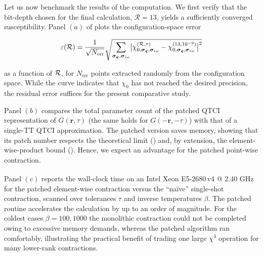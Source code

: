 Let us now benchmark the results of the computation. We first verify that the bit-depth chosen for the final calculation, \(\mathcal R=13\), yields a sufficiently converged susceptibility.
Panel $(a)$ of  plots the configuration-space error

\begin{equation}
    \varepsilon(\mathcal R)
  = \frac{1}{\sqrt{N_{\text{err}}}} \sqrt{\sum_{\boldsymbol{\sigma}_{\boldsymbol{q}},\boldsymbol{\sigma}_{i\omega}} \bigl|
      \chi_{0, \boldsymbol{\sigma}_{\boldsymbol{q}},\boldsymbol{\sigma}_{i\omega}}^{(\mathcal R,\tau)}
      -\chi_{0, \boldsymbol{\sigma}_{\boldsymbol{q}},\boldsymbol{\sigma}_{i\omega}}^{(13, 10^{-9})}
    \bigr|^2}
\end{equation}

as a function of $\mathcal{R}$, for $N_{\text{err}}$ points extracted randomly from the configuration space.  While the curve indicates that \(\chi_{0}\) has not reached the desired precision, the residual error suffices for the present comparative study.

Panel $(b)$ compares the total parameter count of the patched QTCI representation of \(G(\mathbf r,\tau)\) (the same holds for
\(G(-\mathbf r,-\tau)\)) with that of a single-TT QTCI approximation. The patched version saves memory, showing that its patch number respects the theoretical limit
() and, by extension, the element-wise-product bound (). Hence, we expect an advantage for the patched point-wise contraction. 

Panel $(c)$ reports the wall-clock time on an
Intel\textsuperscript{\textregistered} Xeon\textsuperscript{\textregistered}
E5-2680\,v4 @ 2.40 GHz for the patched element-wise contraction versus the
``naïve'' single-shot contraction, scanned over tolerances \(\tau\) and inverse temperatures \(\beta\). The patched routine accelerates the
calculation by up to an order of magnitude.  For the coldest cases $\beta=100,1000$ the monolithic contraction could not be completed owing to excessive memory demands, whereas the patched algorithm ran comfortably, illustrating the practical benefit of trading one large \(\chi^{4}\) operation for many lower-rank contractions.

